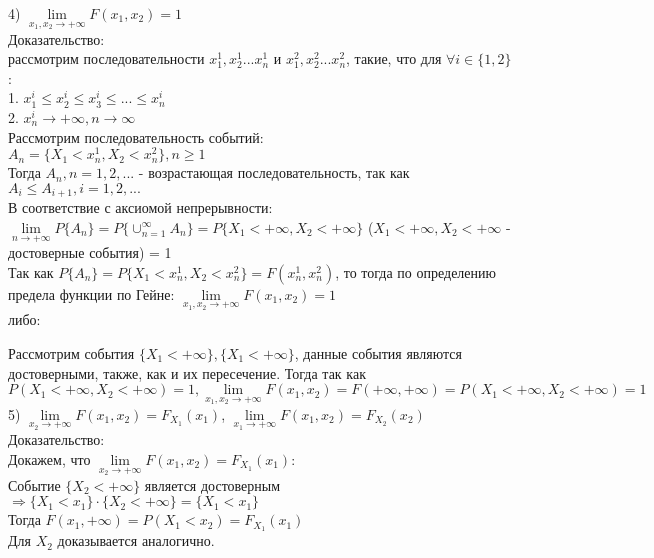 4) $\lim\limits_{x_{1}, x_{2} \rightarrow +\infty} F(x_{1}, x_{2}) = 1$\\
Доказательство:\\
рассмотрим последовательности $x_{1}^{1}, x_{2}^{1} ... x_{n}^{1}$ и $x_{1}^{2}, x_{2}^{2} ... x_{n}^{2}$, такие, что для $\forall i \in \{1, 2\}$:\\
1. $x_{1}^{i} \leqslant x_{2}^{i} \leqslant x_{3}^{i} \leqslant ... \leqslant x_{n}^{i}$\\
2. $x_{n}^{i} \rightarrow +\infty, n \rightarrow \infty$\\
Рассмотрим последовательность событий:\\
$A_{n} = \{X_{1} < x_{n}^{1}, X_{2} < x_{n}^{2}\}, n \geqslant 1$\\
Тогда $A_{n}, n = 1, 2, ...$ - возрастающая последовательность, так как $A_{i} \leqslant A_{i+1}, i = 1, 2, ...$\\
В соответствие с аксиомой непрерывности:\\
$\lim\limits_{n \rightarrow +\infty} P\{A_{n}\} = P \{ \cup^{\infty}_{n = 1} A_{n} \} = P \{ X_{1} < +\infty, X_{2} < +\infty \}$ ($X_{1} < +\infty, X_{2} < +\infty$ - достоверные события) = 1\\
Так как $P\{A_{n}\} = P \{X_{1} <  x_{n}^{1}, X_{2} < x_{n}^{2}\} = F( x_{n}^{1},  x_{n}^{2})$, то тогда по определению предела функции по Гейне: $\lim\limits_{x_{1}, x_{2} \rightarrow +\infty} F(x_{1}, x_{2}) = 1$\\

либо:

Рассмотрим события $\{X_{1} < +\infty\}, \{X_{1} < +\infty\}$, данные события являются достоверными, также, как и их пересечение. Тогда так как $P(X_{1} < +\infty, X_{2} < +\infty) = 1, \lim\limits_{x_{1}, x_{2} \rightarrow +\infty} F(x_{1}, x_{2})  = F(+\infty, +\infty) = P(X_{1} < +\infty, X_{2} < +\infty) = 1$\\

5) $\lim\limits_{x_{2} \rightarrow +\infty} F(x_{1}, x_{2}) = F_{X_1} (x_{1})$, $\lim\limits_{x_{1} \rightarrow +\infty} F(x_{1}, x_{2}) =  F_{X_2} (x_{2})$\\
Доказательство:\\
Докажем, что $\lim\limits_{x_{2} \rightarrow +\infty} F(x_{1}, x_{2}) = F_{X_1} (x_{1})$:\\
Событие $\{X_{2} < +\infty\}$ является достоверным $\Rightarrow \{X_{1} < x_{1}\} \cdot \{X_{2} < +\infty\} = \{X_{1} < x_{1}\}$\\
Тогда $F(x_{1}, +\infty) = P(X_{1} < x_{2}) = F_{X_{1}}(x_{1})$\\
Для $X_{2}$ доказывается аналогично.\\

